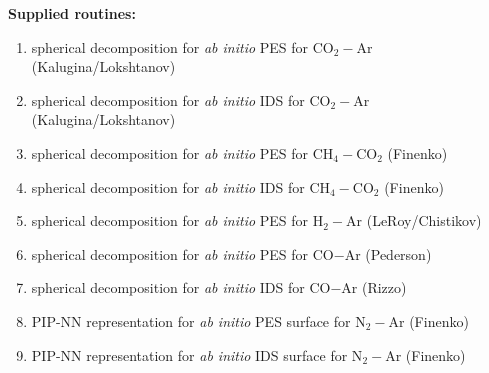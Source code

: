 \documentclass{article}
\begin{document}
\noindent
\textbf{Supplied routines:}
\begin{enumerate}
    \item spherical decomposition for \textit{ab initio} PES for CO$_2-$Ar (Kalugina/Lokshtanov) 
    \item spherical decomposition for \textit{ab initio} IDS for CO$_2-$Ar (Kalugina/Lokshtanov)
    \item spherical decomposition for \textit{ab initio} PES for CH$_4-$CO$_2$ (Finenko)
    \item spherical decomposition for \textit{ab initio} IDS for CH$_4-$CO$_2$ (Finenko)
    \item spherical decomposition for \textit{ab initio} PES for H$_2-$Ar (LeRoy/Chistikov)
    \item spherical decomposition for \textit{ab initio} PES for CO$-$Ar (Pederson)
    \item spherical decomposition for \textit{ab initio} IDS for CO$-$Ar (Rizzo)
    \item PIP-NN representation for \textit{ab initio} PES surface for N$_2-$Ar (Finenko)
    \item PIP-NN representation for \textit{ab initio} IDS surface for N$_2-$Ar (Finenko)
\end{enumerate}
\end{document}
